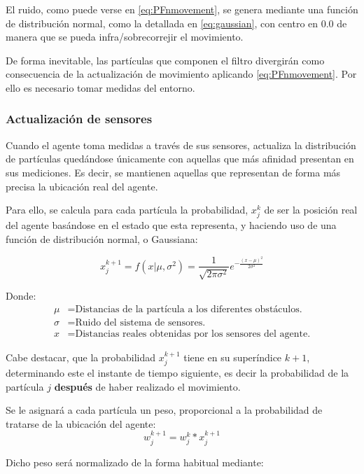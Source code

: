 \noindent El ruido, como puede verse en \ref{eq:PFnmovement}, se genera mediante una función de distribución normal, como la detallada en \ref{eq:gaussian}, con centro en $0.0$ de manera que se pueda infra/sobrecorrejir el movimiento.


De forma inevitable, las partículas que componen el filtro divergirán como consecuencia de la actualización de movimiento aplicando \ref{eq:PFnmovement}. Por ello es necesario tomar medidas del entorno.

\subsubsection{Actualización de sensores}
Cuando el agente toma medidas a través de sus sensores, actualiza la distribución de partículas quedándose únicamente con aquellas que más afinidad presentan en sus mediciones. Es decir, se mantienen aquellas que representan de forma más precisa la ubicación real del agente.

Para ello, se calcula para cada partícula la probabilidad, $x_j^{k}$ de ser la posición real del agente basándose en el estado que esta representa, y haciendo uso de una función de distribución normal, o Gaussiana:

\begin{equation}
\label{eq:gaussian}
x_j^{k+1} = f(x|\mu, \sigma^2)=\frac{1}{\sqrt{2\pi \sigma^2}}e^{-\frac{(x-\mu)^2}{2\sigma^2}}
\end{equation}

Donde:
\begin{align*}
\mu &= \text{Distancias de la partícula a los diferentes obstáculos.}\\
\sigma &= \text{Ruido del sistema de sensores.}\\
x &= \text{Distancias reales obtenidas por los sensores del agente.}
\end{align*}

Cabe destacar, que la probabilidad $x_j^{k+1}$ tiene en su superíndice $k+1$, determinando este el instante de tiempo siguiente, es decir la probabilidad de la partícula $j$ \textbf{después} de haber realizado el movimiento.

Se le asignará a cada partícula un peso, proporcional a la probabilidad de tratarse de la ubicación del agente:
\begin{equation}
w_j^{k+1}=w_j^{k}*x_j^{k+1}
\end{equation}

Dicho peso será normalizado de la forma habitual mediante: 

